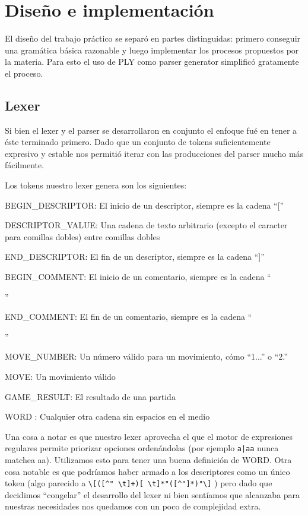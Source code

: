 \section{Diseño e implementación}

El diseño del trabajo práctico se separó en partes distinguidas: primero conseguir una gramática básica razonable y luego implementar los procesos propuestos por la materia. Para esto el uso de PLY como parser generator simplificó gratamente el proceso.

\subsection{Lexer}

Si bien el lexer y el parser se desarrollaron en conjunto el enfoque fué en tener a éste terminado primero. Dado que un conjunto de tokens suficientemente expresivo y estable nos permitió iterar con las producciones del parser mucho más fácilmente.

Los tokens nuestro lexer genera son los siguientes:
\begin{itemize}
    \item BEGIN\_DESCRIPTOR: El inicio de un descriptor, siempre es la cadena ``[''
    \item DESCRIPTOR\_VALUE: Una cadena de texto arbitrario (excepto el caracter para comillas dobles) entre comillas dobles
    \item END\_DESCRIPTOR: El fin de un descriptor, siempre es la cadena ``]''
    \item BEGIN\_COMMENT: El inicio de un comentario, siempre es la cadena ``{''
    \item END\_COMMENT: El fin de un comentario, siempre es la cadena ``}''
    \item MOVE\_NUMBER: Un número válido para un movimiento, cómo ``1...'' o ``2.''
    \item MOVE: Un movimiento válido
    \item GAME\_RESULT: El resultado de una partida
    \item WORD : Cualquier otra cadena sin espacios en el medio
\end{itemize}
    
    
Una cosa a notar es que nuestro lexer aprovecha el que el motor de expresiones regulares permite priorizar opciones ordenándolas (por ejemplo \verb/a|aa/ nunca matchea aa). Utilizamos esto para tener una buena definición de WORD. Otra cosa notable es que podríamos haber armado a los descriptores como un único token (algo parecido a \verb/\[([^" \t]+)[ \t]*"([^"]*)"\]/ )  pero dado que decidimos ``congelar'' el desarrollo del lexer ni bien sentíamos que alcanzaba para nuestras necesidades nos quedamos con un poco de complejidad extra.

